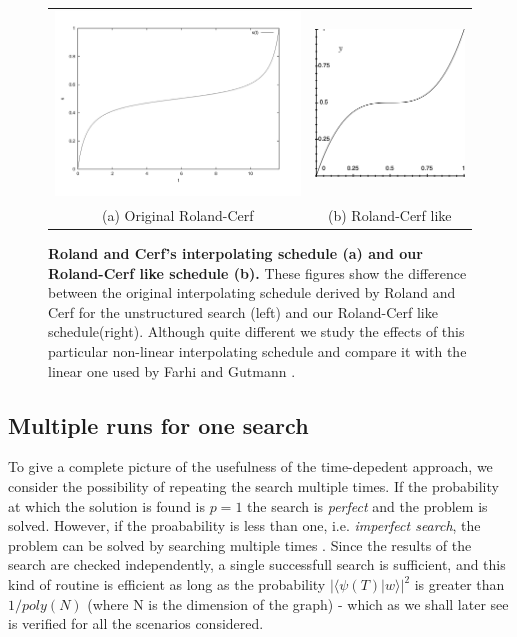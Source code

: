         \begin{figure}[ht]
          \centering
          \begin{tabular}{cc}
            \includegraphics[width=75mm]{./figures/interpolating_schedules/cerf} &   \includegraphics[width=45mm]{./figures/interpolating_schedules/our_cerf} \\
          (a) Original Roland-Cerf & (b) Roland-Cerf like\\[6pt]
          \end{tabular}
          \caption[Roland and Cerf's interpolating schedules for the unstructured search and our non-linear schedule]{\textbf{Roland and Cerf's interpolating schedule (a) and our Roland-Cerf like schedule (b).} These figures show the difference between the original interpolating schedule derived by Roland and Cerf for the unstructured search (left) and our Roland-Cerf like schedule(right). Although quite different we study the effects of this particular non-linear interpolating schedule and compare it with the linear one used by Farhi and Gutmann \cite{Farhi2000}.}
          \label{cerf}
        \end{figure}

        \subsection{Multiple runs for one search}\label{subsec:multiple_runs}
        To give a complete picture of the usefulness of the time-depedent approach, we consider the possibility of repeating the search multiple times. If the probability at which the solution is found is $p=1$ the search is \textit{perfect} and the problem is solved. However, if the proabability is less than one, i.e. \textit{imperfect search}, the problem can be solved by searching multiple times . Since the results of the search are checked independently, a single successfull search is sufficient, and this kind of routine is efficient as long as the probability $\big|\langle\psi(T)| w\rangle\big|^2$ is greater than $1/poly(N)$ (where N is the dimension of the graph) \cite{Morley2018} - which as we shall later see is verified for all the scenarios considered.


